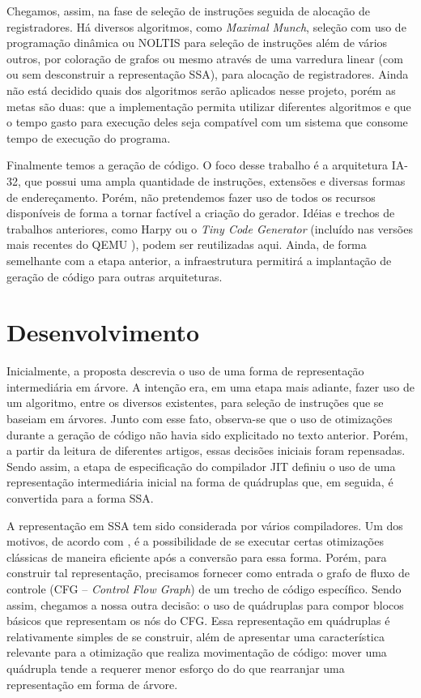 Chegamos, assim, na fase de seleção de instruções
seguida de alocação de registradores. Há diversos algoritmos, como
\textit{Maximal Munch}, seleção com uso de programação dinâmica ou
NOLTIS \cite{noltis}  para seleção de instruções além de vários
outros, por coloração de grafos ou mesmo através de uma varredura
linear \cite{linear_scan_regalloc} (com ou sem \cite{wimmer_franz}
desconstruir a representação SSA), para alocação de registradores.
Ainda não está decidido quais dos algoritmos serão aplicados nesse
projeto, porém as metas são duas: que a implementação permita utilizar
diferentes algoritmos e que o tempo gasto para execução deles
seja compatível com um sistema que consome tempo de execução do programa.

Finalmente temos a geração de código. O foco desse trabalho é a
arquitetura IA-32, que possui uma ampla quantidade de instruções, extensões e
diversas formas de endereçamento.
Porém, não pretendemos fazer uso de todos os recursos disponíveis de
forma a tornar factível a criação do gerador.
Idéias e trechos de trabalhos anteriores, como Harpy \cite{harpy}
ou o \textit{Tiny Code Generator} (incluído nas versões mais recentes do
QEMU \cite{qemu}), podem ser reutilizadas aqui.
Ainda, de forma semelhante com a etapa anterior, a infraestrutura
permitirá a implantação de geração de código para outras arquiteturas.


\section{Desenvolvimento}
\label{desenvolvimento}

Inicialmente, a proposta descrevia o uso de uma forma de representação
intermediária em árvore. A intenção era, em uma etapa mais adiante,
fazer uso de um algoritmo, entre os diversos existentes, para seleção
de instruções que se baseiam em árvores. Junto com esse fato,
observa-se que o uso de otimizações durante a geração de código não
havia sido explicitado no texto anterior. Porém, a partir da leitura de
diferentes artigos, essas decisões iniciais foram repensadas. Sendo
assim, a etapa de especificação do compilador JIT definiu o uso de uma
representação intermediária inicial na forma de quádruplas que, em
seguida, é convertida para a forma SSA.

A representação em SSA tem sido considerada por vários compiladores.
Um dos motivos, de acordo com , é a
possibilidade de se executar certas otimizações clássicas de maneira
eficiente após a conversão para essa forma. Porém, para construir tal
representação, precisamos fornecer como entrada o grafo de fluxo de
controle (CFG -- \textit{Control Flow Graph}) de um trecho de código
específico. Sendo assim, chegamos a nossa outra decisão: o uso de
quádruplas para compor blocos básicos que representam os nós do
CFG. Essa representação em quádruplas é relativamente simples de se
construir, além de apresentar uma característica relevante para a
otimização que realiza movimentação de código: mover
uma quádrupla tende a requerer menor esforço do
do que rearranjar uma representação em forma de árvore.

